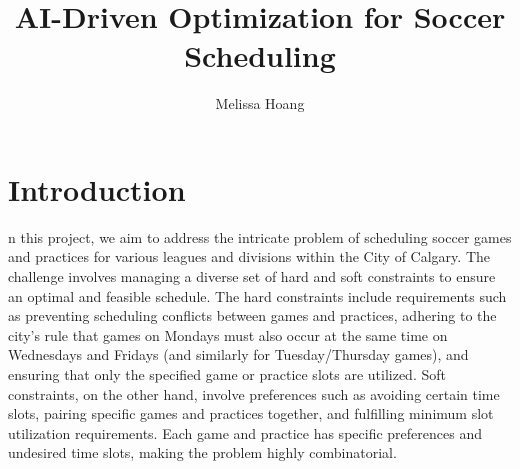 \documentclass[12 pt]{article}        	%
\begin{document}
\title{AI-Driven Optimization for Soccer Scheduling}
\author{Melissa Hoang}
\date{\vspace{-5ex}}










\maketitle

\section{Introduction}
n this project, we aim to address the intricate problem of scheduling soccer games and practices for various leagues and divisions within the City of Calgary. The challenge involves managing a diverse set of hard and soft constraints to ensure an optimal and feasible schedule. The hard constraints include requirements such as preventing scheduling conflicts between games and practices, adhering to the city's rule that games on Mondays must also occur at the same time on Wednesdays and Fridays (and similarly for Tuesday/Thursday games), and ensuring that only the specified game or practice slots are utilized. Soft constraints, on the other hand, involve preferences such as avoiding certain time slots, pairing specific games and practices together, and fulfilling minimum slot utilization requirements. Each game and practice has specific preferences and undesired time slots, making the problem highly combinatorial.
\end{document}
